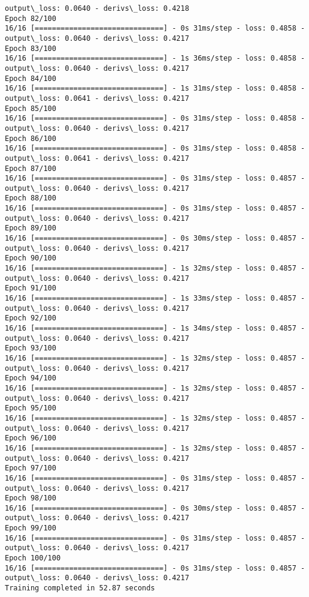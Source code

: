 \documentclass[11pt]{article}
\begin{document}
\begin{Verbatim}[commandchars=\\\{\}]
output\_loss: 0.0640 - derivs\_loss: 0.4218
Epoch 82/100
16/16 [==============================] - 0s 31ms/step - loss: 0.4858 -
output\_loss: 0.0640 - derivs\_loss: 0.4217
Epoch 83/100
16/16 [==============================] - 1s 36ms/step - loss: 0.4858 -
output\_loss: 0.0640 - derivs\_loss: 0.4217
Epoch 84/100
16/16 [==============================] - 1s 31ms/step - loss: 0.4858 -
output\_loss: 0.0641 - derivs\_loss: 0.4217
Epoch 85/100
16/16 [==============================] - 0s 31ms/step - loss: 0.4858 -
output\_loss: 0.0640 - derivs\_loss: 0.4217
Epoch 86/100
16/16 [==============================] - 0s 31ms/step - loss: 0.4858 -
output\_loss: 0.0641 - derivs\_loss: 0.4217
Epoch 87/100
16/16 [==============================] - 0s 31ms/step - loss: 0.4857 -
output\_loss: 0.0640 - derivs\_loss: 0.4217
Epoch 88/100
16/16 [==============================] - 0s 31ms/step - loss: 0.4857 -
output\_loss: 0.0640 - derivs\_loss: 0.4217
Epoch 89/100
16/16 [==============================] - 0s 30ms/step - loss: 0.4857 -
output\_loss: 0.0640 - derivs\_loss: 0.4217
Epoch 90/100
16/16 [==============================] - 1s 32ms/step - loss: 0.4857 -
output\_loss: 0.0640 - derivs\_loss: 0.4217
Epoch 91/100
16/16 [==============================] - 1s 33ms/step - loss: 0.4857 -
output\_loss: 0.0640 - derivs\_loss: 0.4217
Epoch 92/100
16/16 [==============================] - 1s 34ms/step - loss: 0.4857 -
output\_loss: 0.0640 - derivs\_loss: 0.4217
Epoch 93/100
16/16 [==============================] - 1s 32ms/step - loss: 0.4857 -
output\_loss: 0.0640 - derivs\_loss: 0.4217
Epoch 94/100
16/16 [==============================] - 1s 32ms/step - loss: 0.4857 -
output\_loss: 0.0640 - derivs\_loss: 0.4217
Epoch 95/100
16/16 [==============================] - 1s 32ms/step - loss: 0.4857 -
output\_loss: 0.0640 - derivs\_loss: 0.4217
Epoch 96/100
16/16 [==============================] - 1s 32ms/step - loss: 0.4857 -
output\_loss: 0.0640 - derivs\_loss: 0.4217
Epoch 97/100
16/16 [==============================] - 0s 31ms/step - loss: 0.4857 -
output\_loss: 0.0640 - derivs\_loss: 0.4217
Epoch 98/100
16/16 [==============================] - 0s 30ms/step - loss: 0.4857 -
output\_loss: 0.0640 - derivs\_loss: 0.4217
Epoch 99/100
16/16 [==============================] - 0s 31ms/step - loss: 0.4857 -
output\_loss: 0.0640 - derivs\_loss: 0.4217
Epoch 100/100
16/16 [==============================] - 0s 31ms/step - loss: 0.4857 -
output\_loss: 0.0640 - derivs\_loss: 0.4217
Training completed in 52.87 seconds
    \end{Verbatim}
\end{document}
